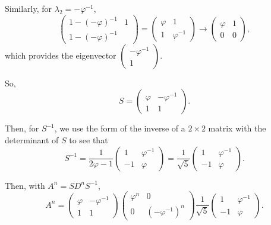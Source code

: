 \documentclass{article}
\begin{document}
Similarly, for $\lambda_2=-\varphi^{-1}$,
\[
  \begin{pmatrix} 1-{(-\varphi)}^{-1} & 1 \\ 1 -{(-\varphi)}^{-1} \end{pmatrix} 
  =
  \begin{pmatrix} \varphi & 1 \\ 1 & \varphi^{-1} \end{pmatrix} 
  \rightarrow
  \begin{pmatrix} \varphi & 1 \\ 0 & 0 \end{pmatrix} 
,\] 
which provides the eigenvector $\begin{pmatrix} -\varphi^{-1} \\ 1 \end{pmatrix}$.

So, \[
  S=\begin{pmatrix} \varphi & -\varphi^{-1} \\ 1 & 1 \end{pmatrix} 
.\] 

Then, for $S^{-1}$, we use the form of the inverse of a $2\times 2$ matrix with the determinant of $S$ to see that
 \[
   S^{-1}=\frac{1}{2\varphi-1}\begin{pmatrix} 1 & \varphi^{-1} \\ -1 & \varphi \end{pmatrix} = \frac{1}{\sqrt{5}}\begin{pmatrix} 1 & \varphi^{-1} \\ -1 & \varphi \end{pmatrix}
.\] 

Then, with $A^n=SD^nS^{-1}$,
\[
  A^n=\begin{pmatrix} \varphi & -\varphi^{-1} \\ 1 & 1 \end{pmatrix}
\begin{pmatrix} \varphi^n & 0 \\ 0 & {(-\varphi^{-1})}^n \end{pmatrix}
\frac{1}{\sqrt{5} }\begin{pmatrix} 1 & \varphi^{-1} \\ -1 & \varphi \end{pmatrix} 
.\] 
\end{document}
